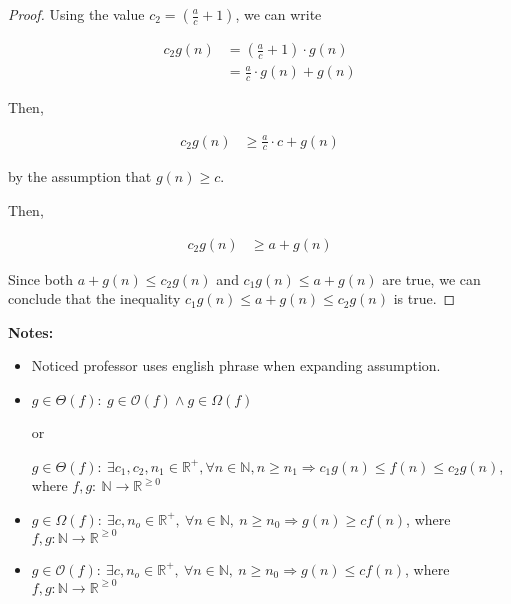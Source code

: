 \documentclass[12pt]{article}
\begin{document}
\begin{itemize}
\begin{proof}
        \bigskip

        Using the value $c_2 = \left( \frac{a}{c} + 1 \right)$, we can write

        \begin{align}
            c_2g(n) &= \left( \frac{a}{c} + 1 \right) \cdot g(n)\\
            &= \frac{a}{c} \cdot g(n) + g(n)
        \end{align}

        \bigskip

        Then,

        \begin{align}
            c_2g(n) &\geq \frac{a}{c} \cdot c + g(n)
        \end{align}

        by the assumption that $g(n) \geq c$.

        \bigskip

        Then,

        \begin{align}
            c_2g(n) &\geq a + g(n)
        \end{align}

        \bigskip

        Since both $a + g(n) \leq c_2g(n)$ and $c_1g(n) \leq a + g(n)$ are true,
        we can conclude that the inequality $c_1g(n) \leq  a + g(n) \leq c_2g(n)$ is true.

    \end{proof}

    \bigskip

    \textbf{Notes:}

    \begin{itemize}
        \item Noticed professor uses english phrase when expanding assumption.

        \item
        $g \in \Theta(f):\: g \in \mathcal{O}(f) \land g \in \Omega(f)$

        or

        $g \in \Theta(f):\:\exists c_1,c_2,n_1 \in \mathbb{R}^{+}, \forall n \in \mathbb{N}, n \geq n_1
        \Rightarrow c_1g(n) \leq f(n) \leq c_2g(n)$, where $f,g:\:\mathbb{N} \to \mathbb{R}^{\geq 0}$

        \item
        $g \in \Omega(f):\:\exists c,n_o \in \mathbb{R}^{+},\:\forall n \in
        \mathbb{N},\:n \geq n_0 \Rightarrow g(n) \geq cf(n)$, where $f,g:\mathbb{N} \to \mathbb{R}^{\geq 0}$

        \item

        $g \in \mathcal{O}(f):\:\exists c,n_o \in \mathbb{R}^{+},\:\forall n \in
        \mathbb{N},\:n \geq n_0 \Rightarrow g(n) \leq cf(n)$, where $f,g:\mathbb{N} \to \mathbb{R}^{\geq 0}$

    \end{itemize}
\end{itemize}
\end{document}
